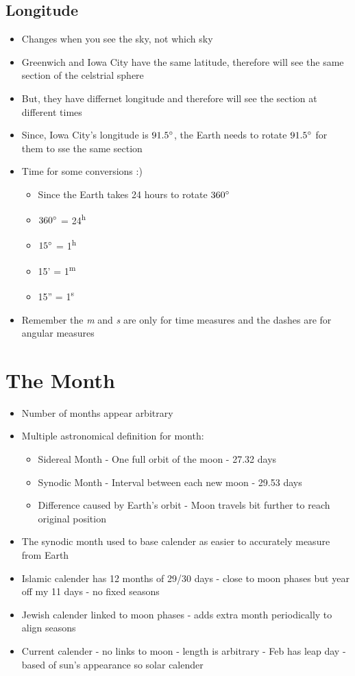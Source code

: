 \documentclass[a4paper, 11pt]{article}
\begin{document}
	\subsection{Longitude}
		\begin{itemize}
			\item Changes when you see the sky, not which sky
			\item Greenwich and Iowa City have the same latitude, therefore will see the same section of the celstrial sphere
			\item But, they have differnet longitude and therefore will see the section at different times
			\item Since, Iowa City's longitude is \(91.5\degree\), the Earth needs to rotate \(91.5\degree\) for them to sse the same section
			\item Time for some conversions :)
				\begin{itemize}
				\item Since the Earth takes 24 hours to rotate \(360\degree\)
				\item \(360\degree\) = 24\textsuperscript{h}
				\item \(15\degree\) = 1\textsuperscript{h}
				\item 15' = 1\textsuperscript{m}
				\item 15'' = 1\textsuperscript{s}
				\end{itemize}
			\item Remember the \textit{m} and \textit{s} are only for time measures and the dashes are for angular measures
		\end{itemize}

\section{The Month}
	\begin{itemize}
		\item Number of months appear arbitrary
		\item Multiple astronomical definition for month:
			\begin{itemize}
			\item Sidereal Month - One full orbit of the moon - 27.32 days
			\item Synodic Month - Interval between each new moon - 29.53 days
			\item Difference caused by Earth's orbit - Moon travels bit further to reach original position
			\end{itemize}
		\item The synodic month used to base calender as easier to accurately measure from Earth
		\item Islamic calender has 12 months of 29/30 days - close to moon phases but year off my 11 days - no fixed seasons
		\item Jewish calender linked to moon phases - adds extra month periodically to align seasons
		\item Current calender - no links to moon - length is arbitrary - Feb has leap day - based of sun's appearance so solar calender
	\end{itemize}
\end{document}
